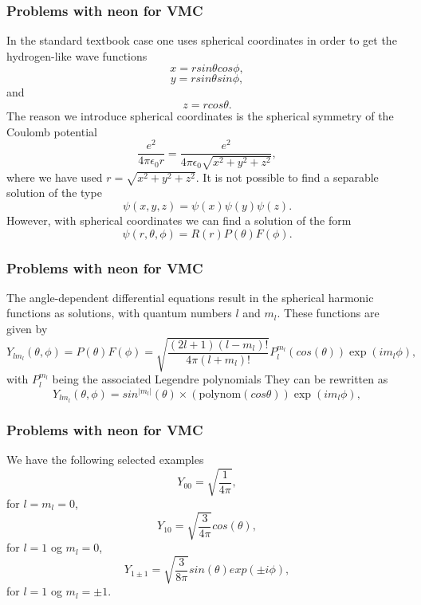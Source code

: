 \documentclass[compress]{beamer}
\begin{document}
\frame
{
  \frametitle{Problems with neon for VMC}
\begin{small}
{\scriptsize
In the standard textbook case one uses spherical coordinates  in order to get the hydrogen-like wave functions
     \[
        x=rsin\theta cos\phi,  
      \]
      \[
        y=rsin\theta sin\phi,
     \]
and
     \[
        z=rcos\theta.
     \]
The reason we introduce spherical coordinates is the spherical symmetry of the Coulomb potential
\[
    \frac{e^2}{4\pi\epsilon_0r}=\frac{e^2}{4\pi\epsilon_0\sqrt{x^2+y^2+z^2}},
\]
where we have used $r=\sqrt{x^2+y^2+z^2}$. 
It is not possible to find a separable solution of the type
\[
    \psi(x,y,z)=\psi(x)\psi(y)\psi(z).
\]
However, with spherical coordinates we can find a solution
of the form
\[
   \psi(r,\theta,\phi)=R(r)P(\theta)F(\phi).
\]
}
\end{small}
}




\frame
{
  \frametitle{Problems with neon for VMC}
\begin{small}
{\scriptsize
The angle-dependent differential equations result in the spherical harmonic functions as
solutions, with quantum numbers $l$ and $m_l$.
These functions are given by
\[
    Y_{lm_l}(\theta,\phi)=P(\theta)F(\phi)=\sqrt{\frac{(2l+1)(l-m_l)!}{4\pi (l+m_l)!}}
                      P_l^{m_l}(cos(\theta))\exp{(im_l\phi)},
\]
with $P_l^{m_l}$ being the associated Legendre polynomials
They can be rewritten as 
\[
   Y_{lm_l}(\theta,\phi)=sin^{|m_l|}(\theta) \times (\mathrm{polynom}(cos\theta))\exp{(im_l\phi)},
\]
}
\end{small}
}


\frame
{
  \frametitle{Problems with neon for VMC}
\begin{small}
{\scriptsize
We have the following selected examples
\[
   Y_{00}=\sqrt{\frac{1}{4\pi}},
\]
for $l=m_l=0$, 
\[
   Y_{10}=\sqrt{\frac{3}{4\pi}}cos(\theta),
\]
for $l=1$ og $m_l=0$, 
\[
   Y_{1\pm 1}=\sqrt{\frac{3}{8\pi}}sin(\theta)exp(\pm i\phi),
\]
for  $l=1$ og $m_l=\pm 1$. 
}
\end{small}
}
\end{document}
